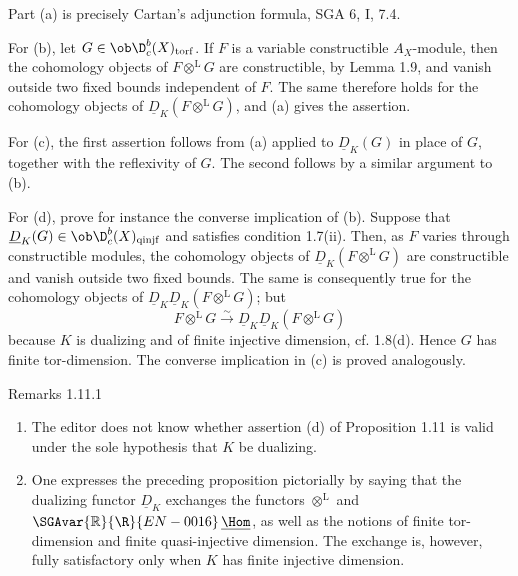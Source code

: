 \begin{prooftext}
Part (a) is precisely Cartan's adjunction formula, SGA 6, I, 7.4.

For (b), let $G\in\ob\D_c^b(X)_{\mathrm{torf}}$. If $F$ is a variable constructible $A_X$-module, then the cohomology objects of $F\otimes^{\mathrm L}G$ are constructible, by Lemma 1.9, and vanish outside two fixed bounds independent of $F$. The same therefore holds for the cohomology objects of $\underline D_K(F\otimes^{\mathrm L}G)$, and (a) gives the assertion.

For (c), the first assertion follows from (a) applied to $\underline D_K(G)$ in place of $G$, together with the reflexivity of $G$. The second follows by a similar argument to (b).

For (d), prove for instance the converse implication of (b). Suppose that $\underline D_K(G)\in\ob\D_c^b(X)_{\mathrm{qinjf}}$ and satisfies condition 1.7(ii). Then, as $F$ varies through constructible modules, the cohomology objects of $\underline D_K(F\otimes^{\mathrm L}G)$ are constructible and vanish outside two fixed bounds. The same is consequently true for the cohomology objects of $\underline D_K\underline D_K(F\otimes^{\mathrm L}G)$; but
\[
   F\otimes^{\mathrm L}G\xrightarrow{\sim}\underline D_K\underline D_K(F\otimes^{\mathrm L}G)
\]
because $K$ is dualizing and of finite injective dimension, cf. 1.8(d). Hence $G$ has finite tor-dimension. The converse implication in (c) is proved analogously. \qedtext
\end{prooftext}

\begin{statement}{Remarks 1.11.1}
\begin{enumerate}[label=\alph*)]
\item The editor does not know whether assertion (d) of Proposition 1.11 is valid under the sole hypothesis that $K$ be dualizing.
\item One expresses the preceding proposition pictorially by saying that the dualizing functor $\underline D_K$ exchanges the functors $\otimes^{\mathrm L}$ and $\SGAvar{\mathbb{R}}{\R}{EN-0016}\,\underline{\Hom}$, as well as the notions of finite tor-dimension and finite quasi-injective dimension. The exchange is, however, fully satisfactory only when $K$ has finite injective dimension.
\end{enumerate}
\end{statement}

